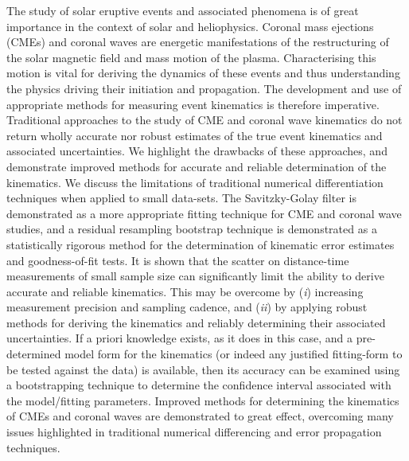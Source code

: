 \documentclass[structabstract]{aa}
\begin{document}
\date{Received ?; accepted ?}
\abstract
{The study of solar eruptive events and associated phenomena is of great importance in the context of solar and heliophysics. Coronal mass ejections (CMEs) and coronal waves are energetic manifestations of the restructuring of the solar magnetic field and mass motion of the plasma. Characterising this motion is vital for deriving the dynamics of these events and thus understanding the physics driving their initiation and propagation. The development and use of appropriate methods for measuring event kinematics is therefore imperative.} 
{Traditional approaches to the study of CME and coronal wave kinematics do not return wholly accurate nor robust estimates of the true event kinematics and associated uncertainties. We highlight the drawbacks of these approaches, and demonstrate improved methods for accurate and reliable determination of the kinematics.}
{We discuss the limitations of traditional numerical differentiation techniques when applied to small data-sets. The Savitzky-Golay filter is demonstrated as a more appropriate fitting technique for CME and coronal wave studies, and a residual resampling bootstrap technique is demonstrated as a statistically rigorous method for the determination of kinematic error estimates and goodness-of-fit tests.}
{It is shown that the scatter on distance-time measurements of small sample size can significantly limit the ability to derive accurate and reliable kinematics. This may be overcome by (\emph{i}) increasing measurement precision and sampling cadence, and (\emph{ii}) by applying robust methods for deriving the kinematics and reliably determining their associated uncertainties. If a priori knowledge exists, as it does in this case, and a pre-determined model form for the kinematics (or indeed any justified fitting-form to be tested against the data) is available, then its accuracy can be examined using a bootstrapping technique to determine the confidence interval associated with the model/fitting parameters.}
{Improved methods for determining the kinematics of CMEs and coronal waves are demonstrated to great effect, overcoming many issues highlighted in traditional numerical differencing and error propagation techniques.}


\end{document}
